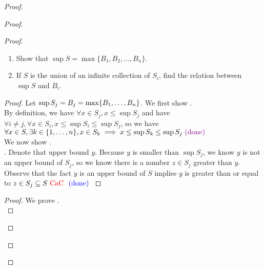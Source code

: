 \documentclass{report}
\begin{document}
\begin{proof}
\begin{proof}
\begin{proof}
\begin{question}{}{}
\begin{enumerate}
    \item Show that \(\sup S = \max\{B_1, B_2, \ldots, B_n\} \).
    \item If \(S\) is the union of an infinite collection of \(S_i\), find the relation between \(\sup S\) and \(B_i\).
\end{enumerate}
\end{question}
\begin{proof}
Let $\sup S_j=B_j=\max \{ B_1,\dots, B_n \}$. We first show .\\

By definition, we have $\forall x\in S_j,x\leq \sup S_j$ and have $\forall i \neq j, \forall x \in S_i, x\leq \sup S_i\leq \sup S_j $, so we have $\forall x\in S, \exists k \in \{ 1,\dots, n \}, x \in S_k \implies x\leq \sup S_k\leq \sup S_j\textcolor{violet}{\text{ (done) }}$\\

We now show  .\\

. Denote that upper bound $y$. Because $y$ is smaller than $\sup S_j$, we know $y$ is not an upper bound of $S_j$, so we know there is a number  $z \in S_j$ greater than $y$. Observe that the fact $y$ is an upper bound of $S$ implies  $y$ is greater than or equal to $z \in S_j\subseteq S\text{ \textcolor{red}{CaC} }\textcolor{blue}{\text{ (done) }}$
\end{proof}
\begin{proof}
  We prove .\\


\end{proof}
\end{proof}
\end{proof}
\end{proof}
\end{document}
